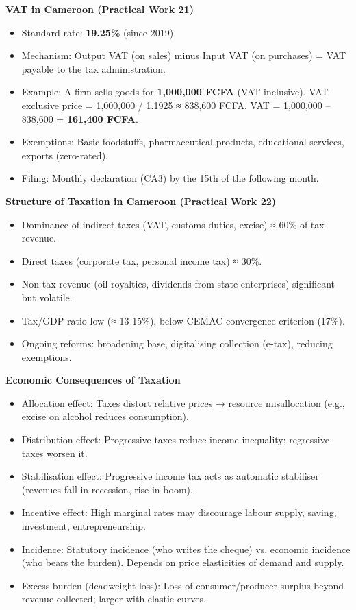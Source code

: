 \documentclass[11pt]{article}
\newcommand{\cle}[1]{{\popxbold\color{popdark}#1}}
\begin{document}
\begin{bilan}
\textbf{VAT in Cameroon (Practical Work 21)}
\begin{itemize}
\item Standard rate: \textbf{19.25\%} (since 2019).
\item Mechanism: Output VAT (on sales) minus Input VAT (on purchases) = VAT payable to the tax administration.
\item Example: A firm sells goods for \textbf{1,000,000 FCFA} (VAT inclusive). VAT-exclusive price = 1,000,000 / 1.1925 ≈ 838,600 FCFA. VAT = 1,000,000 – 838,600 = \textbf{161,400 FCFA}.
\item Exemptions: Basic foodstuffs, pharmaceutical products, educational services, exports (zero-rated).
\item Filing: Monthly declaration (CA3) by the 15th of the following month.
\end{itemize}

\textbf{Structure of Taxation in Cameroon (Practical Work 22)}
\begin{itemize}
\item Dominance of indirect taxes (VAT, customs duties, excise) ≈ 60\% of tax revenue.
\item Direct taxes (corporate tax, personal income tax) ≈ 30\%.
\item Non-tax revenue (oil royalties, dividends from state enterprises) significant but volatile.
\item Tax/GDP ratio low (≈ 13-15\%), below CEMAC convergence criterion (17\%).
\item Ongoing reforms: broadening base, digitalising collection (e-tax), reducing exemptions.
\end{itemize}

\textbf{Economic Consequences of Taxation}
\begin{itemize}
\item \cle{Allocation effect}: Taxes distort relative prices → resource misallocation (e.g., excise on alcohol reduces consumption).
\item \cle{Distribution effect}: Progressive taxes reduce income inequality; regressive taxes worsen it.
\item \cle{Stabilisation effect}: Progressive income tax acts as automatic stabiliser (revenues fall in recession, rise in boom).
\item \cle{Incentive effect}: High marginal rates may discourage labour supply, saving, investment, entrepreneurship.
\item \cle{Incidence}: Statutory incidence (who writes the cheque) vs. economic incidence (who bears the burden). Depends on price elasticities of demand and supply.
\item \cle{Excess burden (deadweight loss)}: Loss of consumer/producer surplus beyond revenue collected; larger with elastic curves.
\end{itemize}


\end{bilan}
\end{document}
